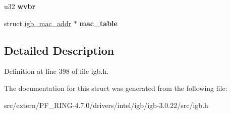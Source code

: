 \begin{DoxyCompactItemize}
\item 
\hypertarget{structigb__adapter_a1724257a2ed1f4510b2e0aa1b94c07b6}{
u32 {\bfseries wvbr}}
\label{structigb__adapter_a1724257a2ed1f4510b2e0aa1b94c07b6}

\item 
\hypertarget{structigb__adapter_abc77635218e83d0f4c0286166d2aa488}{
struct \hyperlink{structigb__mac__addr}{igb\_\-mac\_\-addr} $\ast$ {\bfseries mac\_\-table}}
\label{structigb__adapter_abc77635218e83d0f4c0286166d2aa488}

\end{DoxyCompactItemize}


\subsection{Detailed Description}


Definition at line 398 of file igb.h.



The documentation for this struct was generated from the following file:\begin{DoxyCompactItemize}
\item 
src/extern/PF\_\-RING-\/4.7.0/drivers/intel/igb/igb-\/3.0.22/src/igb.h\end{DoxyCompactItemize}
